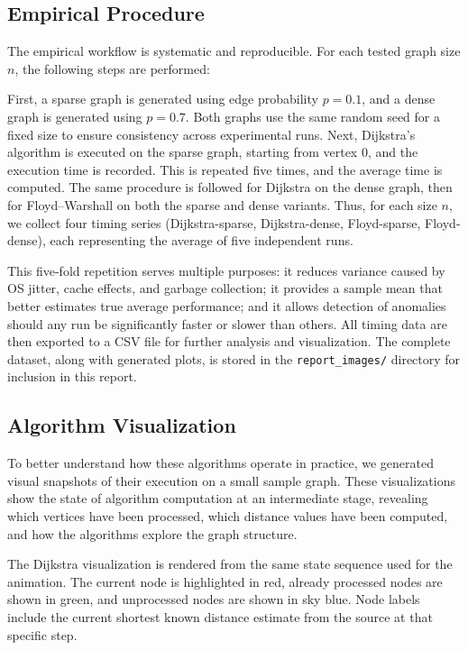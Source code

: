 \documentclass[12pt]{article}
\begin{document}
\subsection{Empirical Procedure}

The empirical workflow is systematic and reproducible. For each tested graph size $n$, the following
steps are performed:

First, a sparse graph is generated using edge probability $p=0.1$, and a dense graph is generated using
$p=0.7$. Both graphs use the same random seed for a fixed size to ensure consistency across experimental runs.
Next, Dijkstra's algorithm is executed on the sparse graph, starting from vertex $0$, and the execution
time is recorded. This is repeated five times, and the average time is computed. The same procedure is
followed for Dijkstra on the dense graph, then for Floyd--Warshall on both the sparse and dense variants.
Thus, for each size $n$, we collect four timing series (Dijkstra-sparse, Dijkstra-dense, Floyd-sparse, Floyd-dense),
each representing the average of five independent runs.

This five-fold repetition serves multiple purposes: it reduces variance caused by OS jitter, cache effects,
and garbage collection; it provides a sample mean that better estimates true average performance; and it
allows detection of anomalies should any run be significantly faster or slower than others. All timing data
are then exported to a CSV file for further analysis and visualization. The complete dataset, along with
generated plots, is stored in the \texttt{report\_images/} directory for inclusion in this report.

\subsection{Algorithm Visualization}

To better understand how these algorithms operate in practice, we generated visual
snapshots of their execution on a small sample graph. These visualizations show the state of
algorithm computation at an intermediate stage, revealing which vertices have been processed,
which distance values have been computed, and how the algorithms explore the graph structure.

The Dijkstra visualization is rendered from the same state sequence used for the animation.
The current node is highlighted in red, already processed nodes are shown in green, and
unprocessed nodes are shown in sky blue. Node labels include the current shortest known
distance estimate from the source at that specific step.
\end{document}

